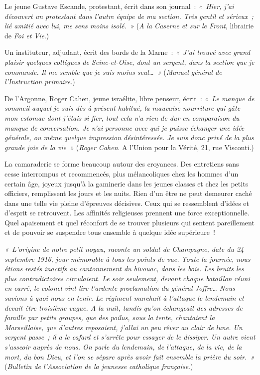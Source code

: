 \documentclass[french,twoside]{book} %
\begin{document}
Le jeune Gustave Escande, protestant, écrit dans son journal : \emph{« Hier, j’ai découvert un protestant dans l’autre équipe de ma section. Très gentil et sérieux ; lié amitié avec lui, me sens moins isolé. »} ({\itshape A la Caserne et sur le Front}, librairie de {\itshape Foi et Vie}.)‌\par
Un instituteur, adjudant, écrit des bords de la Marne : \emph{« J’ai trouvé avec grand plaisir quelques collègues de Seine-et-Oise, dont un sergent, dans la section que je commande. Il me semble que je suis moins seul… »} ({\itshape Manuel général de l’Instruction primaire}.)‌\par
De l’Argonne, Roger Cahen, jeune israélite, libre penseur, écrit : \emph{« Le manque de sommeil auquel je suis dès à présent habitué, la mauvaise nourriture qui gâte mon estomac dont j’étais si fier, tout cela n’a rien de dur en comparaison du manque de conversation. Je n’ai personne avec qui je puisse échanger une idée générale, ou même quelque impression désintéressée. Je suis donc privé de la plus grande joie de la vie »} ({\itshape Roger Cahen}. A l’Union pour la Vérité, 21, rue Visconti.)\par
La camaraderie se forme beaucoup autour des croyances. Des entretiens sans cesse interrompus et recommencés, plus mélancoliques chez les hommes d’un certain âge, joyeux jusqu’à la gaminerie dans les jeunes classes et chez les petits officiers, remplissent les jours et les nuits. Rien d’un être ne peut demeurer caché dans une telle vie pleine d’épreuves décisives. Ceux qui se ressemblent d’idées et d’esprit se retrouvent. Les affinités religieuses prennent une force exceptionnelle. Quel apaisement et quel réconfort de se trouver plusieurs qui sentent pareillement et de pouvoir se suspendre tous ensemble à quelque idée supérieure !‌\par
\emph{« L’origine de notre petit noyau, raconte un soldat de Champagne, date du 24 septembre 1916, jour mémorable à tous les points de vue. Toute la journée, nous étions restés inactifs au cantonnement du bivouac, dans les bois. Les bruits les plus contradictoires circulaient. Le soir seulement, devant chaque bataillon réuni en carré, le colonel vint lire l’ardente proclamation du général Joffre… Nous savions à quoi nous en tenir. Le régiment marchait à l’attaque le lendemain et devait être troisième vague. A la nuit, tandis qu’on échangeait des adresses de famille par petits groupes, que des poilus, sous la tente, chantaient la Marseillaise, que d’autres reposaient, j’allai un peu rêver au clair de lune. Un sergent passe ; il a le cafard et s’arrête pour essayer de le dissiper. Un autre vient s’asseoir auprès de nous. On parle du lendemain, de l’attaque, de la vie, de la mort, du bon Dieu, et l’on se sépare après avoir fait ensemble la prière du soir. »} ({\itshape Bulletin de l’Association de la jeunesse catholique française}.)\par
\end{document}
